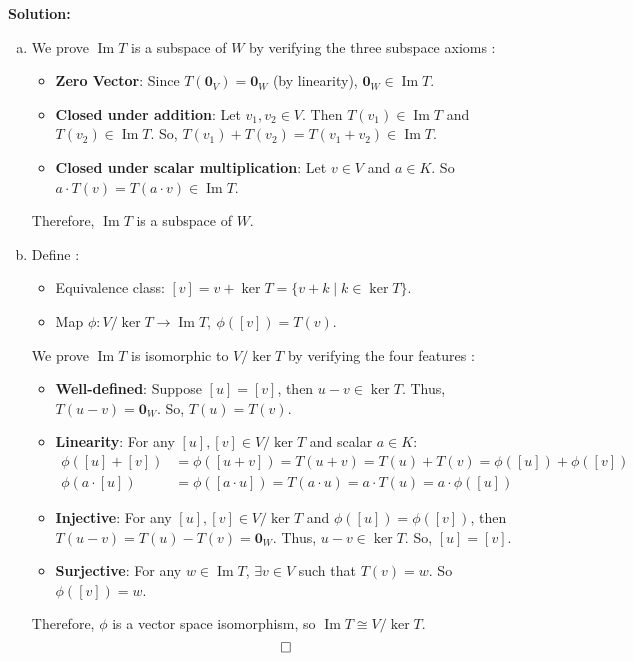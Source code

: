 \documentclass{article}
\DeclareMathOperator{\Ima}{\mathrm{Im}}
\newenvironment{solution}{\color{blue} \smallskip \textbf{Solution:}}{}
\begin{document}
\begin{enumerate}
\begin{solution}
\begin{enumerate}[(a)]
            \item We prove $\Ima T$ is a subspace of $W$ by verifying the three subspace axioms :
            \begin{itemize}
                \item \textbf{Zero Vector}: Since $T(\mathbf{0}_V)=\mathbf{0}_W$ (by linearity), $\mathbf{0}_W \in \Ima T$.
                \item \textbf{Closed under addition}:
                Let $v_1, v_2 \in V$. 
                Then $T(v_1) \in \Ima T$ and $T(v_2) \in \Ima T$. 
                So, $T(v_1) + T(v_2) = T(v_1 + v_2) \in \Ima T$.
                \item \textbf{Closed under scalar multiplication}:
                Let $v \in V$ and $a \in K$.
                So $a \cdot T(v) = T(a \cdot v) \in \Ima T$.
            \end{itemize}
            Therefore, $\Ima T$ is a subspace of $W$.

            \item Define : 
            \begin{itemize}
                \item Equivalence class: $[v] = v + \ker T = \{ v + k \mid k \in \ker T\}$.
                \item Map $\phi \colon V / \ker T \to \Ima T, \ \phi([v]) = T(v)$.
            \end{itemize}
            We prove $\Ima T$ is isomorphic to $V / \ker T$ by verifying the four features :
            \begin{itemize}
                \item \textbf{Well-defined}: 
                Suppose $[u]=[v]$, then $u - v \in \ker T$. Thus, $T(u - v) = \mathbf{0}_W$. So, $T(u) = T(v)$.
                \item \textbf{Linearity}:
                For any $[u], [v] \in V / \ker T$ and scalar $a \in K$:
                \begin{align*}
                    \phi([u] + [v]) &= \phi([u + v]) = T(u + v) = T(u) + T(v) = \phi([u]) + \phi([v]) \\
                    \phi(a \cdot [u]) &= \phi([a \cdot u]) = T(a \cdot u) = a \cdot T(u) = a \cdot \phi([u])
                \end{align*}
                \item \textbf{Injective}:
                For any $[u], [v] \in V / \ker T$ and $\phi([u]) = \phi([v])$, then $T(u - v) = T(u) - T(v) = \mathbf{0}_W$. Thus, $u - v \in \ker T$. So, $[u]=[v]$.
                \item \textbf{Surjective}:
                For any $w \in \Ima T$, $\exists v \in V$ such that $T(v) = w$. So $\phi([v])=w$.
            \end{itemize}
            Therefore, \(\phi\) is a vector space isomorphism, so \(\Ima T \cong V / \ker T\).
            \[ \qedhere \]
            

\end{enumerate}
\end{solution}
\end{enumerate}
\end{document}
